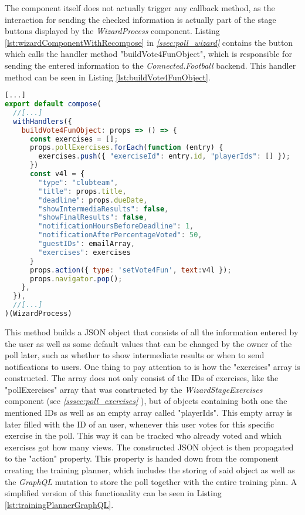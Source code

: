The component itself does not actually trigger any callback method, as the interaction for sending the checked information is actually part of the stage buttons displayed by the \textit{WizardProcess} component. Listing \ref{lst:wizardComponentWithRecompose} in \textit{\ref{ssec:poll_wizard} } contains the button which calls the handler method "buildVote4FunObject", which is responsible for sending the entered information to the \textit{Connected.Football} backend. This handler method can be seen in Listing \ref{lst:buildVote4FunObject}.

\begin{lstlisting}[language=javascript,caption=\textit{buildVote4FunObject} Handler Method,label=lst:buildVote4FunObject]
[...]
export default compose(
  //[...]
  withHandlers({
    buildVote4FunObject: props => () => {
      const exercises = [];
      props.pollExercises.forEach(function (entry) {
        exercises.push({ "exerciseId": entry.id, "playerIds": [] });
      })
      const v4l = {
        "type": "clubteam",
        "title": props.title,
        "deadline": props.dueDate,
        "showIntermediaResults": false,
        "showFinalResults": false,
        "notificationHoursBeforeDeadline": 1,
        "notificationAfterPercentageVoted": 50,
        "guestIDs": emailArray,
        "exercises": exercises
      }
      props.action({ type: 'setVote4Fun', text:v4l });
      props.navigator.pop();
    },
  }),
  //[...]
)(WizardProcess)
\end{lstlisting}

This method builds a JSON object that consists of all the information entered by the user as well as some default values that can be changed by the owner of the poll later, such as whether to show intermediate results or when to send notifications to users. One thing to pay attention to is how the "exercises" array is constructed. The array does not only consist of the IDs of exercises, like the "pollExercises" array that was constructed by the \textit{WizardStageExercises} component (see \textit{\ref{sssec:poll_exercises} }), but of objects containing both one the mentioned IDs as well as an empty array called "playerIds". This empty array is later filled with the ID of an user, whenever this user votes for this specific exercise in the poll. This way it can be tracked who already voted and which exercises got how many views.
\newline
The constructed JSON object is then propagated to the "action" property. This property is handed down from the component creating the training planner, which includes the storing of said object as well as the \textit{GraphQL} mutation to store the poll together with the entire training plan. A simplified version of this functionality can be seen in Listing \ref{lst:trainingPlannerGraphQL}.

